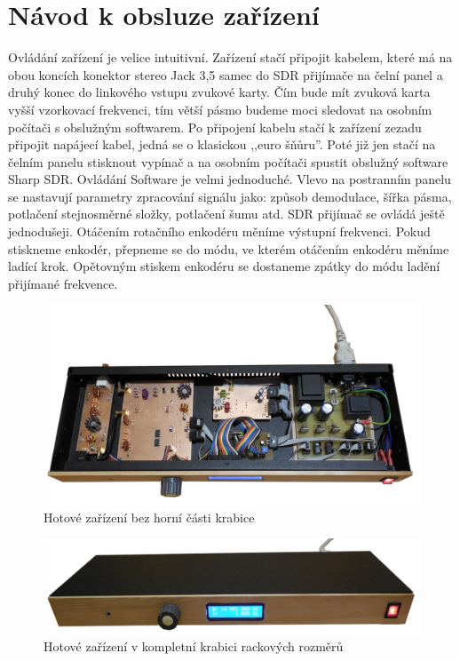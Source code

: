 \clearpage

\section{Návod k obsluze zařízení}
\indent\indent Ovládání zařízení je velice intuitivní. Zařízení stačí připojit kabelem, které má na obou koncích konektor stereo Jack 3,5 samec do SDR přijímače na čelní panel a druhý konec do linkového vstupu zvukové karty. Čím bude mít zvuková karta vyšší vzorkovací frekvenci, tím větší pásmo budeme moci sledovat na osobním počítači s obslužným softwarem. Po připojení kabelu stačí k zařízení zezadu připojit napájecí kabel, jedná se o klasickou ,,euro šňůru''. Poté již jen stačí na  čelním panelu stisknout vypínač a na osobním počítači spustit obslužný software Sharp SDR. Ovládání Software je velmi jednoduché. Vlevo na postranním panelu se nastavují parametry zpracování signálu jako: způsob demodulace, šířka pásma, potlačení stejnosměrné složky, potlačení šumu atd. SDR přijímač se ovládá ještě jednodušeji. Otáčením rotačního enkodéru měníme výstupní frekvenci. Pokud stiskneme enkodér, přepneme se do módu, ve kterém otáčením enkodéru měníme ladící krok. Opětovným stiskem enkodéru se dostaneme zpátky do módu ladění přijímané frekvence.

\begin{figure}[H]
	\centering
	\includegraphics[width=170mm]{img/bez_kritu_sm.png}
	\caption{Hotové zařízení bez horní části krabice}    		
\end{figure}

\begin{figure}[H]
	\centering
	\includegraphics[width=170mm]{img/s_kritem_sm.png}
	\caption{Hotové zařízení v kompletní krabici rackových rozměrů}    		
\end{figure}

\clearpage